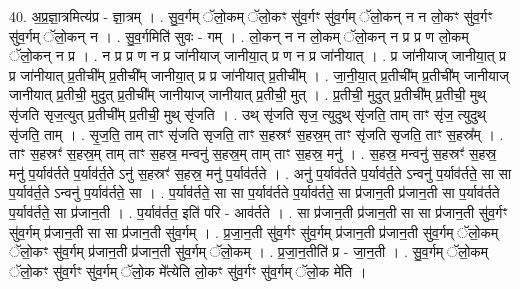 \documentclass[17pt]{extarticle}
\begin{document}
40. अ॒प्र॒ज्ञा॒त्रमित्य॑प्र - ज्ञा॒त्रम् । . सु॒व॒र्गम् ॅलो॒कम् ॅलो॒कꣳ सु॑व॒र्गꣳ सु॑व॒र्गम् ॅलो॒कन् न न लो॒कꣳ सु॑व॒र्गꣳ सु॑व॒र्गम् ॅलो॒कन् न । . सु॒व॒र्गमिति॑ सुवः - गम् । . लो॒कन् न न लो॒कम् ॅलो॒कन् न प्र प्र ण लो॒कम् ॅलो॒कन् न प्र । . न प्र प्र ण न प्र जा॑नीयाज् जानीया॒त् प्र ण न प्र जा॑नीयात् । . प्र जा॑नीयाज् जानीया॒त् प्र प्र जा॑नीयात् प्र॒तीची᳚म् प्र॒तीची᳚म् जानीया॒त् प्र प्र जा॑नीयात् प्र॒तीची᳚म् । . जा॒नी॒या॒त् प्र॒तीची᳚म् प्र॒तीची᳚म् जानीयाज् जानीयात् प्र॒तीची॒ मुदुत् प्र॒तीची᳚म् जानीयाज् जानीयात् प्र॒तीची॒ मुत् । . प्र॒तीची॒ मुदुत् प्र॒तीची᳚म् प्र॒तीची॒ मुथ् सृ॑जति सृज॒त्युत् प्र॒तीची᳚म् प्र॒तीची॒ मुथ् सृ॑जति । . उथ् सृ॑जति सृज॒ त्युदुथ् सृ॑जति॒ ताम् ताꣳ सृ॑ज॒ त्युदुथ् सृ॑जति॒ ताम् । . सृ॒ज॒ति॒ ताम् ताꣳ सृ॑जति सृजति॒ ताꣳ स॒हस्रꣳ॑ स॒हस्र॒म् ताꣳ सृ॑जति सृजति॒ ताꣳ स॒हस्र᳚म् । . ताꣳ स॒हस्रꣳ॑ स॒हस्र॒म् ताम् ताꣳ स॒हस्र॒ मन्वनु॑ स॒हस्र॒म् ताम् ताꣳ स॒हस्र॒ मनु॑ । . स॒हस्र॒ मन्वनु॑ स॒हस्रꣳ॑ स॒हस्र॒ मनु॑ प॒र्याव॑र्तते प॒र्याव॑र्त॒ते ऽनु॑ स॒हस्रꣳ॑ स॒हस्र॒ मनु॑ प॒र्याव॑र्तते । . अनु॑ प॒र्याव॑र्तते प॒र्याव॑र्त॒ते ऽन्वनु॑ प॒र्याव॑र्तते॒ सा सा प॒र्याव॑र्त॒ते ऽन्वनु॑ प॒र्याव॑र्तते॒ सा । . प॒र्याव॑र्तते॒ सा सा प॒र्याव॑र्तते प॒र्याव॑र्तते॒ सा प्र॑जान॒ती प्र॑जान॒ती सा प॒र्याव॑र्तते प॒र्याव॑र्तते॒ सा प्र॑जान॒ती । . प॒र्याव॑र्तत॒ इति॑ परि - आव॑र्तते । . सा प्र॑जान॒ती प्र॑जान॒ती सा सा प्र॑जान॒ती सु॑व॒र्गꣳ सु॑व॒र्गम् प्र॑जान॒ती सा सा प्र॑जान॒ती सु॑व॒र्गम् । . प्र॒जा॒न॒ती सु॑व॒र्गꣳ सु॑व॒र्गम् प्र॑जान॒ती प्र॑जान॒ती सु॑व॒र्गम् ॅलो॒कम् ॅलो॒कꣳ सु॑व॒र्गम् प्र॑जान॒ती प्र॑जान॒ती सु॑व॒र्गम् ॅलो॒कम् । . प्र॒जा॒न॒तीति॑ प्र - जा॒न॒ती । . सु॒व॒र्गम् ॅलो॒कम् ॅलो॒कꣳ सु॑व॒र्गꣳ सु॑व॒र्गम् ॅलो॒क मे᳚त्येति लो॒कꣳ सु॑व॒र्गꣳ सु॑व॒र्गम् ॅलो॒क मे॑ति । \newline
\end{document}
